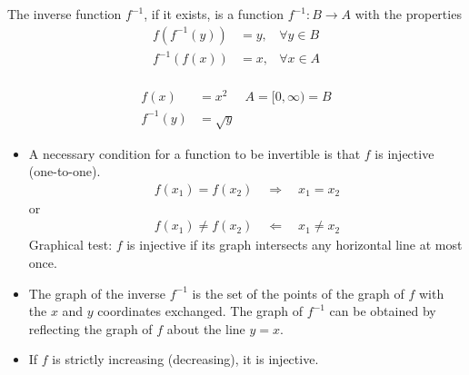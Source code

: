\begin{df}
The inverse function $f^{-1}$, if it exists, is a function $f^{-1} : B \to A$ with the properties
\begin{align*}
f \left(f^{-1}(y) \right) & = y, & \forall y \in B \\
f^{-1}(f(x)) & = x, & \forall x \in A \\
\end{align*}
\end{df}

\begin{ex}
\begin{align*}
f(x) & = x^2 & A= [0,\infty) = B \\
f^{-1}(y) & = \sqrt y 
\end{align*}
\end{ex}
\begin{rk} \mbox \\
\begin{itemize}
\item
A necessary condition for a function to be invertible is that $f$ is injective (one-to-one). 
\begin{align*}
f(x_1) = f(x_2) \quad \Rightarrow \quad x_1 = x_2 
\end{align*}
or
\begin{align*}
f(x_1) \neq f(x_2) \quad \Leftarrow \quad x_1 \neq x_2
\end{align*}
Graphical test: $f$ is injective if its graph intersects any horizontal line at most once.

\item
The graph of the inverse $f^{-1}$ is the set of the points of the graph of $f$ with the $x$ and $y$ coordinates exchanged. The graph of $f^{-1}$ can be obtained by reflecting the graph of $f$ about the line $y=x$.

\item
If $f$ is strictly increasing (decreasing), it is injective.
\end{itemize}
\end{rk}

